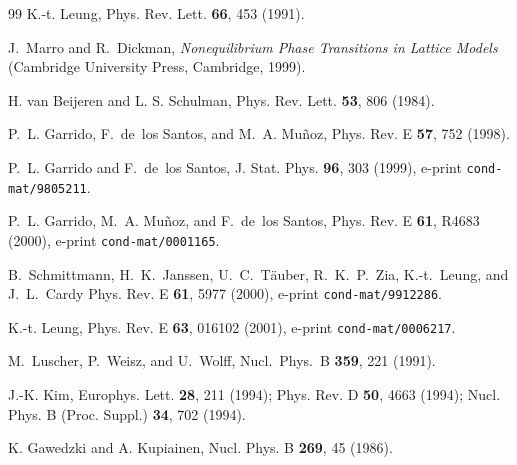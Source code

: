 \documentclass[12pt]{article}
\begin{document}
\begin{thebibliography}{99}
K.-t. Leung,
\newblock Phys. Rev. Lett. {\bf 66}, 453 (1991).

J.~Marro and R.~Dickman,
{\em Nonequilibrium Phase Transitions in Lattice Models} (Cambridge
  University Press, Cambridge, 1999).

H. van Beijeren and L. S. Schulman,
Phys. Rev. Lett. {\bf 53}, 806 (1984).

P.~L. Garrido, F.~de~los Santos, and M.~A. Mu{\~n}oz,
Phys. Rev. E {\bf 57}, 752 (1998).

P.~L. Garrido and F.~de~los Santos,
J. Stat. Phys. {\bf 96}, 303 (1999), 
e-print {\tt cond-mat/9805211}.

P.~L. Garrido, M.~A. Mu{\~n}oz, and F.~de~los Santos,
Phys. Rev. E {\bf 61}, R4683 (2000),
e-print {\tt cond-mat/0001165}.

B.~Schmittmann, H.~K.~Janssen, U.~C.~T{\"a}uber,
R.~K.~P.~Zia, {K.-t.}~Leung, and J.~L.~Cardy 
\newblock Phys. Rev. E {\bf 61}, 5977 (2000),
e-print {\tt cond-mat/9912286}.

K.-t. Leung,
\newblock Phys. Rev. E {\bf 63}, 016102 (2001),
e-print {\tt cond-mat/0006217}.

M.~Luscher, P.~Weisz, and U.~Wolff,
Nucl.\ Phys.\ B {\bf 359}, 221 (1991).

J.-K. Kim,
Europhys. Lett. {\bf 28}, 211 (1994);
Phys. Rev. D {\bf 50}, 4663 (1994);
Nucl. Phys. B (Proc. Suppl.) {\bf 34}, 702 (1994).

K. Gawedzki and A. Kupiainen,
Nucl. Phys. B {\bf 269}, 45 (1986).


\end{thebibliography}

\newpage

 
\end{document}
